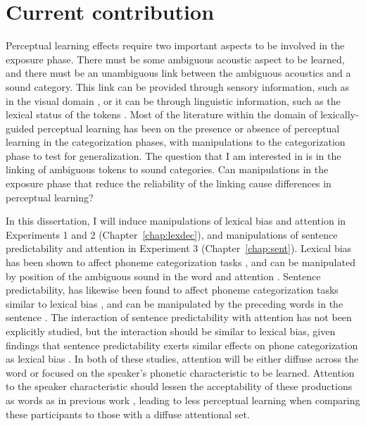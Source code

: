\section{Current contribution}

Perceptual learning effects require two important aspects to be involved in the exposure phase.  
There must be some ambiguous acoustic aspect to be learned, and there must be an unambiguous link between the ambiguous acoustics and a sound category. 
This link can be provided through sensory information, such as in the visual domain \citep{Bertelson2003}, or it can be through linguistic information, such as the lexical status of the tokens \citep{Norris2003}. 
Most of the literature within the domain of lexically-guided perceptual learning has been on the presence or absence of perceptual learning in the categorization phases, with manipulations to the categorization phase to test for generalization.  
The question that I am interested in is in the linking of ambiguous tokens to sound categories.  
Can manipulations in the exposure phase that reduce the reliability of the linking cause differences in perceptual learning?

In this dissertation,  I will induce manipulations of lexical bias and attention in Experiments 1 and 2 (Chapter~\ref{chap:lexdec}), and manipulations of sentence predictability and attention in Experiment 3 (Chapter~\ref{chap:sent}). 
Lexical bias has been shown to affect phoneme categorization tasks \citep{Ganong1980}, and can be manipulated by position of the ambiguous sound in the word and attention \citep{Pitt2012}.  
Sentence predictability, has likewise been found to affect phoneme categorization tasks similar to lexical bias \citep{Borsky1998}, and can be manipulated by the preceding words in the sentence \citep{Kalikow1977}.  
The interaction of sentence predictability with attention has not been explicitly studied, but the interaction should be similar to lexical bias, given findings that sentence predictability exerts similar effects on phone categorization as lexical bias \citep{Borsky1998}.  In both of these studies, attention will be either diffuse across the word or focused on the speaker's phonetic characteristic to be learned.  Attention to the speaker characteristic should lessen the acceptability of these productions as words as in previous work \citep{Pitt2012}, leading to less perceptual learning when comparing these participants to those with a diffuse attentional set.
